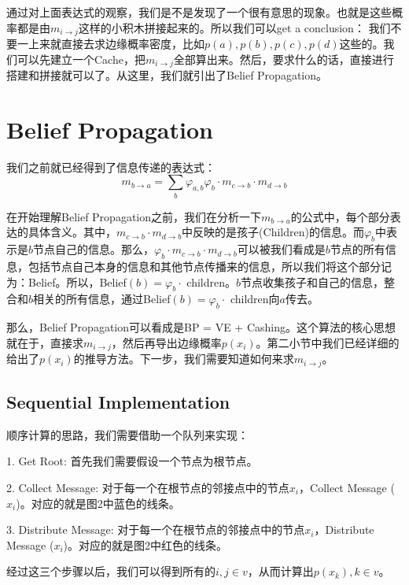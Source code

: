 \documentclass[a4paper]{article}
\begin{document}
通过对上面表达式的观察，我们是不是发现了一个很有意思的现象。也就是这些概率都是由$m_{i\longrightarrow j}$这样的小积木拼接起来的。所以我们可以get a conclusion：{\color{red} 我们不要一上来就直接去求边缘概率密度，比如$p(a),p(b),p(c),p(d)$这些的。我们可以先建立一个Cache，把$m_{i\longrightarrow j}$全部算出来。然后，要求什么的话，直接进行搭建和拼接就可以了。}从这里，我们就引出了Belief Propagation。

\section{Belief Propagation}
我们之前就已经得到了信息传递的表达式：
\begin{equation}
    m_{b\longrightarrow a}=\sum_{b}\varphi_{a,b}\varphi_b \cdot m_{c\longrightarrow b}\cdot m_{d\longrightarrow b}
\end{equation}

在开始理解Belief Propagation之前，我们在分析一下$m_{b\longrightarrow a}$的公式中，每个部分表达的具体含义。其中，$m_{c\longrightarrow b}\cdot m_{d\longrightarrow b}$中反映的是孩子(Children)的信息。而$\varphi_b$中表示是$b$节点自己的信息。那么，$\varphi_b \cdot m_{c\longrightarrow b}\cdot m_{d\longrightarrow b}$可以被我们看成是$b$节点的所有信息，包括节点自己本身的信息和其他节点传播来的信息，所以我们将这个部分记为：Belief。所以，Belief$(b)=\varphi_b\cdot$ children。$b$节点收集孩子和自己的信息，整合和$b$相关的所有信息，通过Belief$(b)=\varphi_b\cdot$ children向$a$传去。

那么，Belief Propagation可以看成是BP = VE + Cashing。这个算法的核心思想就在于，直接求$m_{i\longrightarrow j}$，然后再导出边缘概率$p(x_i)$。第二小节中我们已经详细的给出了$p(x_i)$的推导方法。下一步，我们需要知道如何来求$m_{i\longrightarrow j}$。

\subsection{Sequential Implementation}
顺序计算的思路，我们需要借助一个队列来实现：

1. Get Root: 首先我们需要假设一个节点为根节点。

2. Collect Message: 对于每一个在根节点的邻接点中的节点$x_i$，Collect Message ($x_i$)。对应的就是图2中蓝色的线条。

3. Distribute Message: 对于每一个在根节点的邻接点中的节点$x_i$，Distribute Message ($x_i$)。对应的就是图2中红色的线条。

经过这三个步骤以后，我们可以得到所有的$i,j\in v$，从而计算出$p(x_k),k\in v$。
\end{document}
